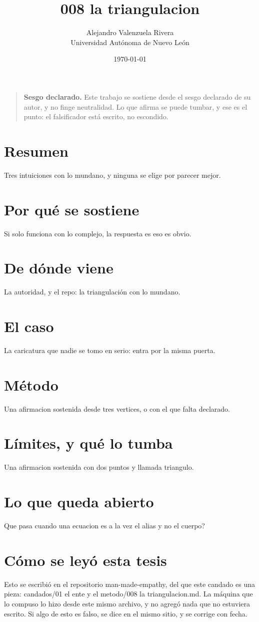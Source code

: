 \documentclass[11pt,a4paper]{article}
\title{008 la triangulacion}
\author{Alejandro Valenzuela Rivera\\\small Universidad Autónoma de Nuevo León}
\date{\today}
\begin{document}
\maketitle

\begin{quote}
\textbf{Sesgo declarado.} Este trabajo se sostiene desde el sesgo declarado de su autor, y no finge neutralidad. Lo que afirma se puede tumbar, y ese es el punto: el falsificador está escrito, no escondido.
\end{quote}

\section*{Resumen}
Tres intuiciones con lo mundano, y ninguna se elige por parecer mejor.

\section{Por qué se sostiene}
Si solo funciona con lo complejo, la respuesta es eso es obvio.

\section{De dónde viene}
La autoridad, y el repo: la triangulación con lo mundano.

\section{El caso}
La caricatura que nadie se tomo en serio: entra por la misma puerta.

\section{Método}
Una afirmacion sostenida desde tres vertices, o con el que falta declarado.

\section{Límites, y qué lo tumba}
Una afirmacion sostenida con dos puntos y llamada triangulo.

\section{Lo que queda abierto}
\textquestiondown{}Que pasa cuando una ecuacion es a la vez el alias y no el cuerpo?

\section*{Cómo se leyó esta tesis}
Esto se escribió en el repositorio man-made-empathy, del que este candado es una pieza: candados/01 el ente y el metodo/008 la triangulacion.md. La máquina que lo compuso lo hizo desde este mismo archivo, y no agregó nada que no estuviera escrito. Si algo de esto es falso, se dice en el mismo sitio, y se corrige con fecha.
\end{document}
